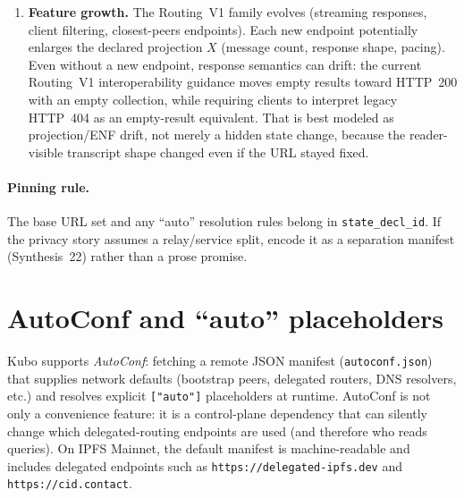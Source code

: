 \documentclass[11pt]{article}
\begin{document}
\begin{enumerate}[leftmargin=*]
In addition, the Helia delegated-routing client caches successful (HTTP~200) responses in browser environments (Cache API) for a short TTL, creating a second, often-overlooked cache layer that affects what is observable when.\cite{heliaDelegatedRoutingClientCache}
\item \textbf{Feature growth.} The Routing~V1 family evolves (streaming responses, client filtering, closest-peers endpoints).\cite{ipip0410,ipip0484,ipip0476}
Each new endpoint potentially enlarges the declared projection $X$ (message count, response shape, pacing).
Even without a new endpoint, response semantics can drift: the current Routing~V1 interoperability guidance moves empty results toward HTTP~200 with an empty collection, while requiring clients to interpret legacy HTTP~404 as an empty-result equivalent. That is best modeled as projection/ENF drift, not merely a hidden state change, because the reader-visible transcript shape changed even if the URL stayed fixed.\cite{ipip0513,ipfsDelegatedRoutingV1Spec}
\end{enumerate}

\paragraph{Pinning rule.}
The base URL set and any ``auto'' resolution rules belong in \texttt{state\_decl\_id}.
If the privacy story assumes a relay/service split, encode it as a separation manifest (Synthesis~22) rather than a prose promise.
\cite{series:primarysepmanifest}

\section{AutoConf and ``auto'' placeholders}
Kubo supports \emph{AutoConf}: fetching a remote JSON manifest (\texttt{autoconf.json}) that supplies network defaults (bootstrap peers, delegated routers, DNS resolvers, etc.) and resolves explicit \texttt{["auto"]} placeholders at runtime.\cite{kuboConfigAutoconf,kuboChangelogV037,kuboRPCexpandAuto,ipfsMainnetAutoConfJSON,ipfsMainnetAutoConfSite}
AutoConf is not only a convenience feature: it is a control-plane dependency that can silently change which delegated-routing endpoints are used (and therefore who reads queries). On IPFS Mainnet, the default manifest is machine-readable and includes delegated endpoints such as \texttt{https://delegated-ipfs.dev} and \texttt{https://cid.contact}.\cite{ipfsMainnetAutoConfJSON}
\end{document}
